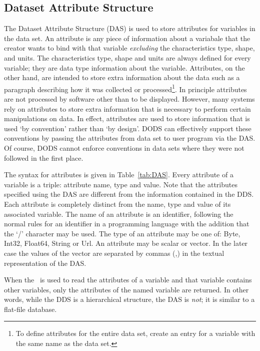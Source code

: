 \subsection{Dataset Attribute Structure}
\label{api:das}

The Dataset Attribute Structure (DAS) is used to store attributes for
variables in the data set. An attribute is any piece of information about a
variabale that the creator wants to bind with that variable {\em excluding\/}
the characteristics type, shape, and units. The characteristics type, shape
and units are always defined for every variable; they are data type
information about the variable. Attributes, on the other hand, are intended
to store extra information about the data such as a paragraph describing how
it was collected or processed\footnote{To define attributes for the entire
  data set, create an entry for a variable with the same name as the data
  set.}. In principle attributes are not processed by software other than to
be displayed. However, many systems rely on attributes to store extra
information that is necessary to perform certain manipulations on data. In
effect, attributes are used to store information that is used `by convention'
rather than `by design'. DODS can effectively support these conventions by
passing the attributes from data set to user program via the DAS\@. Of course,
DODS cannot enforce conventions in data sets where they were not followed in
the first place.

The syntax for attributes is given in Table~\ref{tab:DAS}. Every attribute of
a variable is a triple: attribute name, type and value. Note that the
attributes specified using the DAS are different from the information
contained in the DDS\@. Each attribute is completely distinct from the name,
type and value of its associated variable. The name of an attribute is an
identifier, following the normal rules for an identifier in a programming
language with the addition that the `/' character may be used. The type of an
attribute may be one of: Byte, Int32, Float64, String or Url. An attribute
may be scalar or vector. In the later case the values of the vector are
separated by commas (,) in the textual representation of the DAS\@. 

When the \dap\ is used to read the attributes of a variable and that variable
contains other variables, only the attributes of the named variable are
returned. In other words, while the DDS is a hierarchical structure, the DAS
is {\em not\/}; it is similar to a flat-file database.

